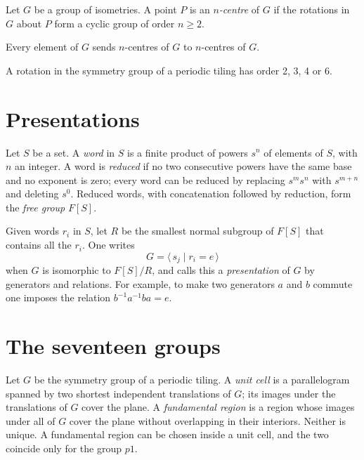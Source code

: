 \begin{definition}
\label{definition-n-centre}
Let $G$ be a group of isometries. A point $P$
is an \emph{$n$-centre} of $G$ if the
rotations in $G$ about $P$ form a cyclic
group of order $n\geq2$.
\end{definition}

\begin{proposition}
\label{proposition-centres}
Every element of $G$ sends $n$-centres of $G$
to $n$-centres of $G$.
\end{proposition}

\begin{theorem}
\label{theorem-crystallographic-restriction}
A rotation in the symmetry group of a periodic
tiling has order 2, 3, 4 or 6.
\end{theorem}

\section{Presentations}
\label{section-presentations}

\noindent
Let $S$ be a set. A \emph{word} in $S$ is a
finite product of powers $s^n$ of elements of
$S$, with $n$ an integer. A word is
\emph{reduced} if no two consecutive powers
have the same base and no exponent is zero;
every word can be reduced by replacing
$s^ms^n$ with $s^{m+n}$ and deleting $s^0$.
Reduced words, with concatenation followed by
reduction, form the \emph{free group} $F[S]$.

Given words $r_i$ in $S$, let $R$ be the
smallest normal subgroup of $F[S]$ that
contains all the $r_i$. One writes
$$
G=\langle\, s_j \mid r_i=e \,\rangle
$$
when $G$ is isomorphic to $F[S]/R$, and calls
this a \emph{presentation} of $G$ by
generators and relations. For example, to
make two generators $a$ and $b$ commute one
imposes the relation $b^{-1}a^{-1}ba=e$.

\section{The seventeen groups}
\label{section-seventeen}

\noindent
Let $G$ be the symmetry group of a periodic
tiling. A \emph{unit cell} is a parallelogram
spanned by two shortest independent
translations of $G$; its images under the
translations of $G$ cover the plane. A
\emph{fundamental region} is a region whose
images under all of $G$ cover the plane
without overlapping in their interiors.
Neither is unique. A fundamental region can
be chosen inside a unit cell, and the two
coincide only for the group $p1$.

